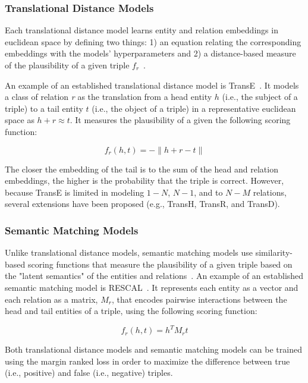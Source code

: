 \subsubsection{Translational Distance Models}

Each translational distance model learns entity and relation embeddings in euclidean space by defining two things: 1) an equation relating the corresponding embeddings with the models' hyperparameters and 2) a distance-based measure of the plausibility of a given triple $f_r$~\cite{Wang2017}.

An example of an established translational distance model is TransE~\cite{Bordes2013}.
It models a class of relation \textit{r} as the translation from a head entity $h$ (i.e., the subject of a triple) to a tail entity $t$ (i.e., the object of a triple) in a representative euclidean space as $h + r \approx t$.
It measures the plausibility of a given the following scoring function:

\begin{equation}\label{eq:trans_e_scoring_function}
    f_r(h,t) = - \|h + r - t\|
\end{equation}

The closer the embedding of the tail is to the sum of the head and relation embeddings, the higher is the probability that the triple is correct.
However, because TransE is limited in modeling $1-N$, $N-1$, and to $N-M$ relations, several extensions have been proposed (e.g., TransH, TransR, and TransD).

\subsubsection{Semantic Matching Models}

Unlike translational distance models, semantic matching models use similarity-based scoring functions that measure the plausibility of a given triple based on the "latent semantics" of the entities and relations~\cite{Wang2017}.
An example of an established semantic matching model is RESCAL~\cite{Nickel2011}.
It represents each entity as a vector and each relation as a matrix, $M_r$, that encodes pairwise interactions between the head and tail entities of a triple, using the following scoring function:

\begin{equation}\label{eq:rescal_scoring_function}
    f_r(h,t) = h^{T} M_{r} t
\end{equation}

Both translational distance models and semantic matching models can be trained using the margin ranked loss in order to maximize the difference between true (i.e., positive) and false (i.e., negative) triples.

